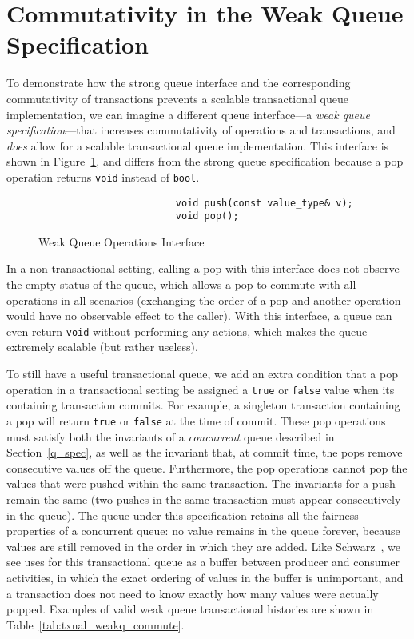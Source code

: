 \section{Commutativity in the Weak Queue Specification}
\label{wqueue}

To demonstrate how the strong queue interface and the corresponding commutativity of transactions prevents a scalable transactional queue implementation, we can imagine a different queue interface---a \emph{weak queue specification}---that increases commutativity of operations and transactions, and \emph{does} allow for a scalable transactional queue implementation. This interface is shown in Figure~\ref{fig:wq_interface}, and differs from the strong queue specification because a pop operation returns \texttt{void} instead of \texttt{bool}. 

\begin{figure}[t]
    \centering
    \begin{lstlisting}
                        void push(const value_type& v); 
                        void pop();                     
    \end{lstlisting}
    \caption{Weak Queue Operations Interface}
    \label{fig:wq_interface}
\end{figure}

In a non-transactional setting, calling a pop with this interface does not observe the empty status of the queue, which allows a pop to commute with all operations in all scenarios (exchanging the order of a pop and another operation would have no observable effect to the caller). With this interface, a queue can even return \texttt{void} without performing any actions, which makes the queue extremely scalable (but rather useless). 

To still have a useful transactional queue, we add an extra condition that a pop operation in a transactional setting be assigned a \texttt{true} or \texttt{false} value when its containing transaction commits. For example, a singleton transaction containing a pop will return \texttt{true} or \texttt{false} at the time of commit.
These pop operations must satisfy both the invariants of a \emph{concurrent} queue described in Section~\ref{q_spec}, as well as the invariant that, at commit time, the pops remove consecutive values off the queue. Furthermore, the pop operations cannot pop the values that were pushed within the same transaction. The invariants for a push remain the same (two pushes in the same transaction must appear consecutively in the queue).
The queue under this specification retains all the fairness properties of a concurrent queue: no value remains in the queue forever, because values are still removed in the order in which they are added. Like Schwarz~\cite{schwarz}, we see uses for this transactional queue as a buffer between producer and consumer activities, in which the exact ordering of values in the buffer is unimportant, and a transaction does not need to know exactly how many values were actually popped. Examples of valid weak queue transactional histories are shown in Table~\ref{tab:txnal_weakq_commute}.

